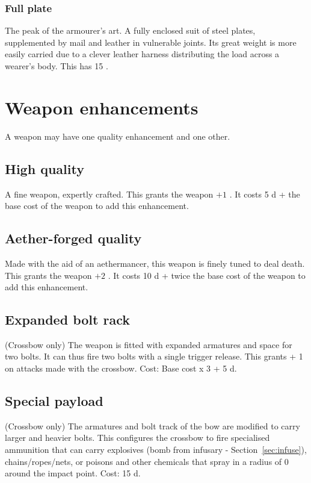\documentclass[a4paper,11pt,oneside]{book}
\newcommand{\textlf}[1]{\textbf{\titlecap{#1}}}
\begin{document}
\subsubsection{Full plate}
The peak of the armourer's art. A fully enclosed suit of steel plates, supplemented by mail and leather in vulnerable joints. Its great weight is more easily carried due to a clever leather harness distributing the load across a wearer's body. This has 15 \textlf{toughness}. 



\section{Weapon enhancements}
A weapon may have one quality enhancement and one other. 

\subsection{High quality}
A fine weapon, expertly crafted. This grants the weapon $+1$ \textlf{Power}. It costs 5 d + the base cost of the weapon to add this enhancement.

\subsection{Aether-forged quality}
Made with the aid of an aethermancer, this weapon is finely tuned to deal death. This grants the weapon $+2$ \textlf{Power}. It costs 10 d + twice the base cost of the weapon to add this enhancement.

\subsection{Expanded bolt rack}
(Crossbow only) The weapon is fitted with expanded armatures and space for two bolts. It can thus fire two bolts with a single trigger release. This grants \textlf{Burst} + 1 on attacks made with the crossbow. Cost: Base cost x 3 + 5 d. 

\subsection{Special payload}
(Crossbow only) The armatures and bolt track of the bow are modified to carry larger and heavier bolts. This configures the crossbow to fire specialised ammunition that can carry explosives (bomb from infusary - Section~\ref{sec:infuse}), chains/ropes/nets, or poisons and other chemicals that spray in a radius of 0 around the impact point. Cost: 15 d.
\end{document}
